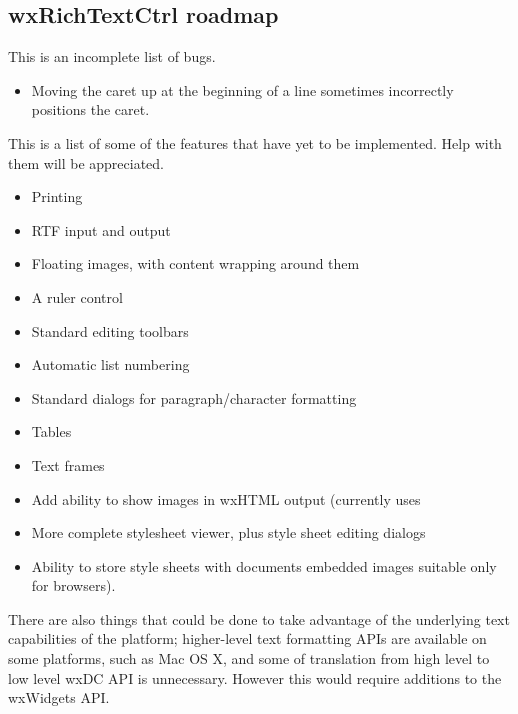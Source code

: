 \subsection{wxRichTextCtrl roadmap}


This is an incomplete list of bugs.

\begin{itemize}
\item Moving the caret up at the beginning of a line sometimes incorrectly positions the
caret.
\end{itemize}


This is a list of some of the features that have yet to be implemented. Help with them will be appreciated.

\begin{itemize}
\item Printing
\item RTF input and output
\item Floating images, with content wrapping around them
\item A ruler control
\item Standard editing toolbars
\item Automatic list numbering
\item Standard dialogs for paragraph/character formatting
\item Tables
\item Text frames
\item Add ability to show images in wxHTML output (currently uses
\item More complete stylesheet viewer, plus style sheet editing dialogs
\item Ability to store style sheets with documents
embedded images suitable only for browsers).
\end{itemize}

There are also things that could be done to take advantage of the underlying text capabilities of the platform;
higher-level text formatting APIs are available on some platforms, such as Mac OS X, and some of translation from
high level to low level wxDC API is unnecessary. However this would require additions to the wxWidgets API.
